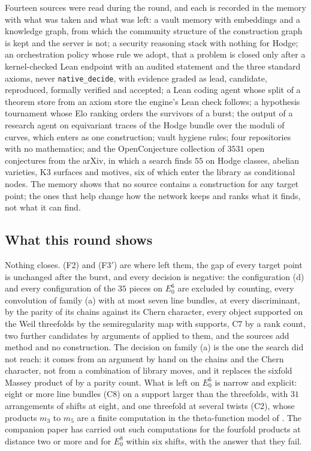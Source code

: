 Fourteen sources were read during the round, and each is recorded in the memory with what was taken and what was left: a vault memory with embeddings and a knowledge graph, from which the community structure of the construction graph is kept and the server is not; a security reasoning stack with nothing for Hodge; an orchestration policy whose rule we adopt, that a problem is closed only after a kernel-checked Lean endpoint with an audited statement and the three standard axioms, never \texttt{native\_decide}, with evidence graded as lead, candidate, reproduced, formally verified and accepted; a Lean coding agent whose split of a theorem store from an axiom store the engine's Lean check follows; a hypothesis tournament whose Elo ranking orders the survivors of a burst; the output of a research agent on equivariant traces of the Hodge bundle over the moduli of curves, which enters as one construction; vault hygiene rules; four repositories with no mathematics; and the OpenConjecture collection of $3531$ open conjectures from the arXiv, in which a search finds $55$ on Hodge classes, abelian varieties, K3 surfaces and motives, six of which enter the library as conditional nodes. The memory shows that no source contains a construction for any target point; the ones that help change how the network keeps and ranks what it finds, not what it can find.

\subsection{What this round shows}\label{ssec:hodgeverdict}

Nothing closes. (F2) and (F3$'$) are where \cite{BB26c} left them, the gap of every target point is unchanged after the burst, and every decision is negative: the configuration (d) and every configuration of the $35$ pieces on $E_{0}^{6}$ are excluded by counting, every convolution of family (a) with at most seven line bundles, at every discriminant, by the parity of its chains against its Chern character, every object supported on the Weil threefolds by the semiregularity map with supports, C7 by a rank count, two further candidates by arguments of \cite{BB26c} applied to them, and the sources add method and no construction. The decision on family (a) is the one the search did not reach: it comes from an argument by hand on the chains and the Chern character, not from a combination of library moves, and it replaces the sixfold Massey product of \cite{BB26c} by a parity count. What is left on $E_{0}^{6}$ is narrow and explicit: eight or more line bundles (C8) on a support larger than the threefolds, with $31$ arrangements of shifts at eight, and one threefold at several twists (C2), whose products $m_{3}$ to $m_{5}$ are a finite computation in the theta-function model of \cite{BMB26b}. The companion paper \cite{BMB26b} has carried out such computations for the fourfold products at distance two or more and for $E_{0}^{8}$ within six shifts, with the answer that they fail.
